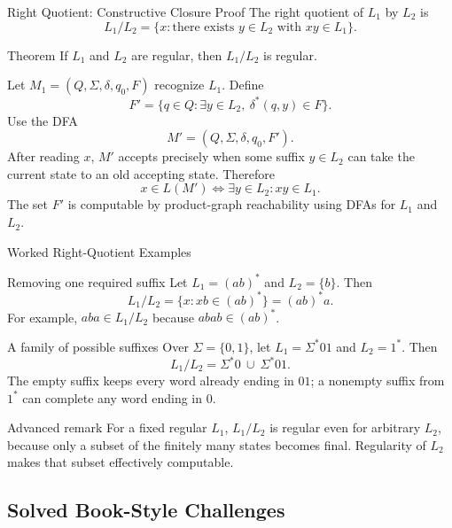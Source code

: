 \documentclass[10pt]{beamer}
\begin{document}
\begin{frame}{Right Quotient: Constructive Closure Proof}
  \small
  The right quotient of $L_1$ by $L_2$ is
  \[
    L_1/L_2=\{x:\text{there exists }y\in L_2\text{ with }xy\in L_1\}.
  \]
  \begin{block}{Theorem}
    If $L_1$ and $L_2$ are regular, then $L_1/L_2$ is regular.
  \end{block}
  Let $M_1=(Q,\Sigma,\delta,q_0,F)$ recognize $L_1$. Define
  \[
    F'=\{q\in Q:\exists y\in L_2,\ \delta^*(q,y)\in F\}.
  \]
  Use the DFA
  \[
    M'=(Q,\Sigma,\delta,q_0,F').
  \]
  After reading $x$, $M'$ accepts precisely when some suffix $y\in L_2$
  can take the current state to an old accepting state. Therefore
  \[
    x\in L(M')\iff\exists y\in L_2:xy\in L_1.
  \]
  The set $F'$ is computable by product-graph reachability using DFAs for
  $L_1$ and $L_2$.
\end{frame}

\begin{frame}{Worked Right-Quotient Examples}
  \footnotesize
  \begin{exampleblock}{Removing one required suffix}
    Let $L_1=(ab)^*$ and $L_2=\{b\}$. Then
    \[
      L_1/L_2
      =\{x:xb\in(ab)^*\}
      =(ab)^*a.
    \]
    For example, $aba\in L_1/L_2$ because $abab\in(ab)^*$.
  \end{exampleblock}
  \begin{exampleblock}{A family of possible suffixes}
    Over $\Sigma=\{0,1\}$, let
    $L_1=\Sigma^*01$ and $L_2=1^*$. Then
    \[
      L_1/L_2=\Sigma^*0\ \cup\ \Sigma^*01.
    \]
    The empty suffix keeps every word already ending in $01$; a nonempty
    suffix from $1^*$ can complete any word ending in $0$.
  \end{exampleblock}
  \begin{alertblock}{Advanced remark}
    For a fixed regular $L_1$, $L_1/L_2$ is regular even for arbitrary
    $L_2$, because only a subset of the finitely many states becomes final.
    Regularity of $L_2$ makes that subset effectively computable.
  \end{alertblock}
\end{frame}

\subsection{Solved Book-Style Challenges}
\end{document}
